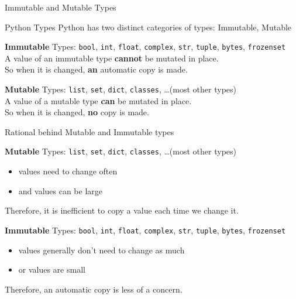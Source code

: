 \documentclass[10pt, colorlinks=true, urlcolor=blue]{beamer}
\begin{document}
\begin{frame}{Immutable and Mutable Types}
  \begin{block}{Python Types}
    Python has two distinct categories of types: Immutable, Mutable
  \end{block}
  
  \vspace{2.4em}
  
  \textbf{Immutable} Types: \texttt{bool}, \texttt{int}, \texttt{float}, \texttt{complex}, \texttt{str}, \texttt{tuple}, \texttt{bytes}, \texttt{frozenset} \\
  
  \vspace{-0.8em}
  A value of an immutable type \textbf{cannot} be mutated in place. \\
  So when it is changed, \textbf{an} automatic copy is made. \\
  
  \vspace{2.0em}
  
  \textbf{Mutable} Types: \texttt{list}, \texttt{set}, \texttt{dict}, \texttt{classes}, \dots (most other types) \\
  
  \vspace{-0.8em}
  A value of a mutable type \textbf{can} be mutated in place. \\
  So when it is changed, \textbf{no} copy is made.
\end{frame}

\begin{frame}{Rational behind Mutable and Immutable types}
 
  \textbf{Mutable} Types: \texttt{list}, \texttt{set}, \texttt{dict}, \texttt{classes}, \dots (most other types)
  \begin{itemize}
  \item values need to change often
  \item and values can be large
  \end{itemize}
  Therefore, it is inefficient to copy a value each time we change it.
  
  \vspace{3em}
  
  \textbf{Immutable} Types: \texttt{bool}, \texttt{int}, \texttt{float}, \texttt{complex}, \texttt{str}, \texttt{tuple}, \texttt{bytes}, \texttt{frozenset}
  \begin{itemize}
  \item values generally don't need to change as much
  \item or values are small
  \end{itemize}
  Therefore, an automatic copy is less of a concern.

  \vspace{2em}
  
\end{frame}
\end{document}
